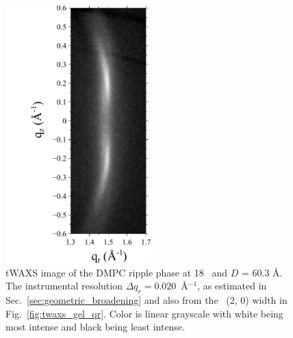 \begin{figure}[htbp]
  \centering
  \includegraphics[trim=20 0 0 0,clip,width=0.5\textwidth]{figures/ripple/tWAXS/twaxs_ripple}
  \caption[tWAXS image of the DMPC
  ripple phase at 18 \textcelsius\ and $D$ = 60.3 \AA]
  {tWAXS image of the DMPC
  ripple phase at 18 \textcelsius\ and $D$ = 60.3 \AA. 
  The instrumental resolution $\Delta q_r=0.020$~\AA$^{-1}$, as estimated in 
  Sec.~\ref{sec:geometric_broadening} and also from the \LbetaI\ (2, 0) width 
  in Fig.~\ref{fig:twaxs_gel_qr}. Color is linear grayscale
  with white being most intense and black being least intense.}
  \label{fig:twaxs_ripple}
\end{figure}

